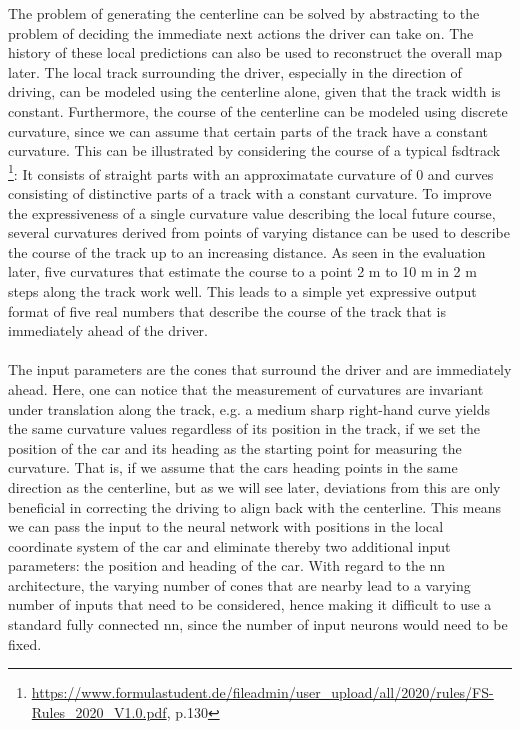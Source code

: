 The problem of generating the centerline can be solved by abstracting to the problem of deciding the immediate next actions the driver can take on. The history of these local predictions can also be used to reconstruct the overall map later. The local track surrounding the driver, especially in the direction of driving, can be modeled using the centerline alone, given that the track width is constant. Furthermore, the course of the centerline can be modeled using discrete curvature, since we can assume that certain parts of the track have a constant curvature. This can be illustrated by considering the course of a typical \ac{fsd}track \footnote{\url{https://www.formulastudent.de/fileadmin/user_upload/all/2020/rules/FS-Rules_2020_V1.0.pdf}, p.130}: It consists of straight parts with an approximatate curvature of 0 and curves consisting of distinctive parts of a track with a constant curvature. To improve the expressiveness of a single curvature value describing the local future course, several curvatures derived from points of varying distance can be used to describe the course of the track up to an increasing distance. As seen in the evaluation later, five curvatures that estimate the course to a point 2 m to 10 m in 2 m steps along the track work well. This leads to a simple yet expressive output format of five real numbers that describe the course of the track that is immediately ahead of the driver. \\\\The input parameters are the cones that surround the driver and are immediately ahead. Here, one can notice that the measurement of curvatures are invariant under translation along the track, e.g. a medium sharp right-hand curve yields the same curvature values regardless of its position in the track, if we set the position of the car and its heading as the starting point for measuring the curvature. That is, if we assume that the cars heading points in the same direction as the centerline, but as we will see later, deviations from this are only beneficial in correcting the driving to align back with the centerline. This means we can pass the input to the neural network with positions in the local coordinate system of the car and eliminate thereby two additional input parameters: the position and heading of the car. With regard to the \ac{nn} architecture, the varying number of cones that are nearby lead to a varying number of inputs that need to be considered, hence making it difficult to use a standard fully connected \ac{nn}, since the number of input neurons would need to be fixed.
